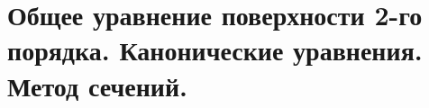 \section{Общее уравнение поверхности 2-го порядка. Канонические уравнения. Метод сечений.}

\pagebreak